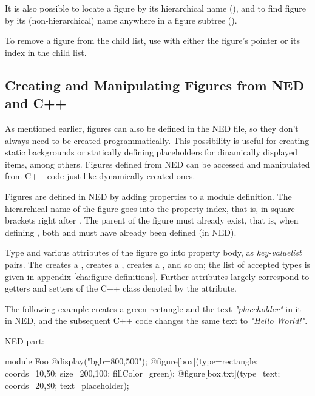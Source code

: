 It is also possible to locate a figure by its hierarchical name
(), and to find figure by its (non-hierarchical)
name anywhere in a figure subtree ().

To remove a figure from the child list, use  with
either the figure's pointer or its index in the child list.


\subsection{Creating and Manipulating Figures from NED and C++}

As mentioned earlier, figures can also be defined in the NED file, so they
don't always need to be created programmatically. This possibility is
useful for creating static backgrounds or statically defining placeholders
for dinamically displayed items, among others. Figures defined from NED can
be accessed and manipulated from C++ code just like dynamically created
ones.

Figures are defined in NED by adding  properties to a module definition.
The hierarchical name of the figure goes into the property index, that is, in
square brackets right after . The parent of the figure must
already exist, that is, when defining , both  and
 must have already been defined (in NED).

Type and various attributes of the figure go into property body, as
\textit{key-valuelist} pairs. The  creates a
,  creates a
,  creates a ,
and so on; the list of accepted types is given in appendix
\ref{cha:figure-definitions}. Further attributes largely correspond to
getters and setters of the C++ class denoted by the  attribute.

The following example creates a green rectangle and the text
\textit{"placeholder"} in it in NED, and the subsequent C++ code changes
the same text to \textit{"Hello World!"}.

NED part:

\begin{ned}
module Foo
{
    @display("bgb=800,500");
    @figure[box](type=rectangle; coords=10,50; size=200,100; fillColor=green);
    @figure[box.txt](type=text; coords=20,80; text=placeholder);
}
\end{ned}

